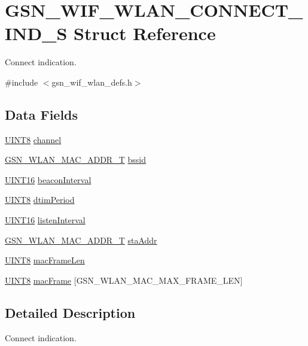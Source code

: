 \hypertarget{a00373}{
\section{GSN\_\-WIF\_\-WLAN\_\-CONNECT\_\-IND\_\-S Struct Reference}
\label{a00373}
}


Connect indication.  




{\ttfamily \#include $<$gsn\_\-wif\_\-wlan\_\-defs.h$>$}

\subsection*{Data Fields}
\begin{DoxyCompactItemize}
\item 
\hyperlink{a00660_gab27e9918b538ce9d8ca692479b375b6a}{UINT8} \hyperlink{a00373_a52d69a3bd7bdfdfc6f9e40f4962c575d}{channel}
\item 
\hyperlink{a00416}{GSN\_\-WLAN\_\-MAC\_\-ADDR\_\-T} \hyperlink{a00373_a1d70c2c8895c2763bdede85266c38318}{bssid}
\item 
\hyperlink{a00660_ga09f1a1fb2293e33483cc8d44aefb1eb1}{UINT16} \hyperlink{a00373_a54a6c03695574d9381214937f9dc6d57}{beaconInterval}
\item 
\hyperlink{a00660_gab27e9918b538ce9d8ca692479b375b6a}{UINT8} \hyperlink{a00373_a299cd846e383cf8f77d0c2e71083caba}{dtimPeriod}
\item 
\hyperlink{a00660_ga09f1a1fb2293e33483cc8d44aefb1eb1}{UINT16} \hyperlink{a00373_a6429fe517dc48f11feaf8351ddf5c934}{listenInterval}
\item 
\hyperlink{a00416}{GSN\_\-WLAN\_\-MAC\_\-ADDR\_\-T} \hyperlink{a00373_a3ca54ba7eb6c301c5b6584284a9ccb8b}{staAddr}
\item 
\hyperlink{a00660_gab27e9918b538ce9d8ca692479b375b6a}{UINT8} \hyperlink{a00373_a0501545f895b958ac06fac25a344c502}{macFrameLen}
\item 
\hyperlink{a00660_gab27e9918b538ce9d8ca692479b375b6a}{UINT8} \hyperlink{a00373_a7ad37558062b4ab07712e6577fbd8b88}{macFrame} \mbox{[}GSN\_\-WLAN\_\-MAC\_\-MAX\_\-FRAME\_\-LEN\mbox{]}
\end{DoxyCompactItemize}


\subsection{Detailed Description}
Connect indication. 

